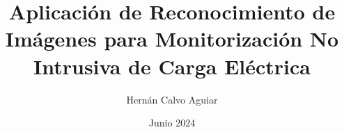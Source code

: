 \newcommand{\Estudios}{Grado}

\newcommand{\TituloEstudios}{Ingeniería Informática}

\newcommand{\Departamento}{Departamento de Inteligencia Artificial (DIA)}

\newcommand{\NombreAutor}{Hernán Calvo Aguiar}

\newcommand{\NombreTutor}{Esteban Garcia Cuesta}

\newcommand{\TituloTFG}{Aplicación de Reconocimiento de Imágenes para Monitorización No Intrusiva de Carga Eléctrica}

\newcommand{\Fecha}{Junio 2024}

\title{\TituloTFG}
\author{\NombreAutor}
\date{\Fecha}
